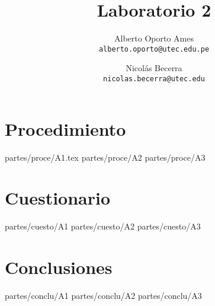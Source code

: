 \documentclass[12pt]{article}
\title{\textbf{Laboratorio 2}}
\author{
		Alberto Oporto Ames\\
		\texttt{alberto.oporto@utec.edu.pe}\\
		\and Nicolás Becerra\\
		\texttt{nicolas.becerra@utec.edu}\\
		}
\begin{document}
\maketitle
\thispagestyle{fancy}

\section{Procedimiento}%
\label{sec:procedimiento}

{partes/proce/A1.tex}
{partes/proce/A2}
{partes/proce/A3}

\section{Cuestionario}%
\label{sec:cuestionario}

{partes/cuesto/A1}
{partes/cuesto/A2}
{partes/cuesto/A3}

\section{Conclusiones}%
\label{sec:conclusiones}

{partes/conclu/A1}
{partes/conclu/A2}
{partes/conclu/A3}
\end{document}
